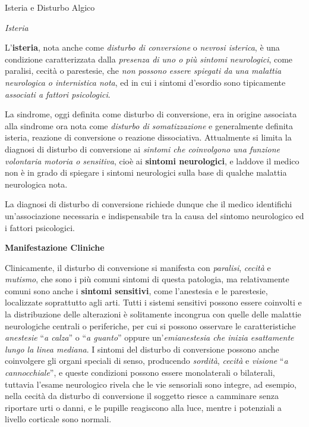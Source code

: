 \documentclass[]{article}
\date{}
\begin{document}
Isteria e Disturbo Algico

\emph{Isteria}

L'\textbf{isteria}, nota anche come \emph{disturbo di conversione} o
\emph{nevrosi isterica}, è una condizione caratterizzata dalla
\emph{presenza di uno o più sintomi neurologici}, come paralisi, cecità
o parestesie, che \emph{non possono essere spiegati da una malattia
neurologica o internistica nota}, ed in cui i sintomi d'esordio sono
tipicamente \emph{associati a fattori psicologici}.

La sindrome, oggi definita come disturbo di conversione, era in origine
associata alla sindrome ora nota come \emph{disturbo di somatizzazione}
e generalmente definita isteria, reazione di conversione o reazione
dissociativa. Attualmente si limita la diagnosi di disturbo di
conversione ai \emph{sintomi che coinvolgono una funzione volontaria
motoria o sensitiva}, cioè ai \textbf{sintomi neurologici}, e laddove il
medico non è in grado di spiegare i sintomi neurologici sulla base di
qualche malattia neurologica nota.

La diagnosi di disturbo di conversione richiede dunque che il medico
identifichi un'associazione necessaria e indispensabile tra la causa del
sintomo neurologico ed i fattori psicologici.

\textbf{Manifestazione Cliniche}

Clinicamente, il disturbo di conversione si manifesta con
\emph{paralisi}, \emph{cecità} e \emph{mutismo}, che sono i più comuni
sintomi di questa patologia, ma relativamente comuni sono anche i
\textbf{sintomi sensitivi}, come l'anestesia e le parestesie,
localizzate soprattutto agli arti. Tutti i sistemi sensitivi possono
essere coinvolti e la distribuzione delle alterazioni è solitamente
incongrua con quelle delle malattie neurologiche centrali o periferiche,
per cui si possono osservare le caratteristiche \emph{anestesie}
``\emph{a calza}'' o ``\emph{a guanto}'' oppure un'\emph{emianestesia
che inizia esattamente lungo la linea mediana}. I sintomi del disturbo
di conversione possono anche coinvolgere gli organi speciali di senso,
producendo \emph{sordità}, \emph{cecità} e \emph{visione} ``\emph{a
cannocchiale}'', e queste condizioni possono essere monolaterali o
bilaterali, tuttavia l'esame neurologico rivela che le vie sensoriali
sono integre, ad esempio, nella cecità da disturbo di conversione il
soggetto riesce a camminare senza riportare urti o danni, e le pupille
reagiscono alla luce, mentre i potenziali a livello corticale sono
normali.
\end{document}
